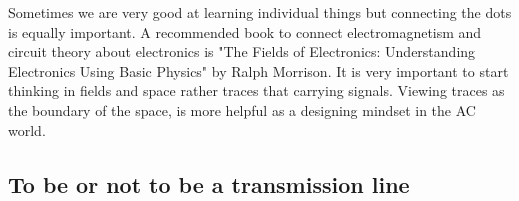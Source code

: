\documentclass[final]{cubedoc}
\begin{document}
	
	
	
	Sometimes we are very good at learning individual things but connecting the dots is equally important. A recommended book to connect electromagnetism and circuit theory about electronics is "The Fields of Electronics: Understanding Electronics Using Basic Physics" by Ralph Morrison. It is very important to start thinking in fields and space rather traces that carrying signals. Viewing traces as the boundary of the space, is more helpful as a designing mindset in the AC world.
	
	
	\subsection{To be or not to be a transmission line}
	
\end{document}
